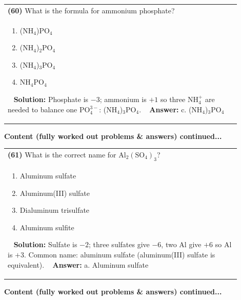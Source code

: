 \documentclass{article}
\begin{document}
\begin{tabular}{|p{0.9\linewidth}|}
\hline
\vspace{0.2cm}
\textbf{(60)} What is the formula for ammonium phosphate? \\
\begin{minipage}[t]{0.85\linewidth}
\begin{enumerate}[label=\alph*.]
\item (NH$_4$)PO$_4$ \
\item (NH$_4$)$_2$PO$_4$ \
\item (NH$_4$)$_3$PO$_4$ \
\item NH$_4$PO$_4$
\end{enumerate}
\end{minipage}\
\hline
\vspace{0.2cm}
\textbf{Solution:} Phosphate is $-3$; ammonium is $+1$ so three NH$_4^+$ are needed to balance one PO$_4^{3-}$: (NH$_4$)$_3$PO$_4$. \
\hline
\vspace{0.2cm}
\textbf{Answer:} c. (NH$_4$)$_3$PO$_4$ \
\hline
\end{tabular}
\newpage
\noindent
{\large\textbf{Content (fully worked out problems & answers) continued...}}\\[0.2em]
\begin{tabular}{|p{0.9\linewidth}|}
\hline
\vspace{0.2cm}
\textbf{(61)} What is the correct name for $\text{Al}_2(\text{SO}_4)_3$? \\
\begin{minipage}[t]{0.85\linewidth}
\begin{enumerate}[label=\alph*.]
\item Aluminum sulfate \
\item Aluminum(III) sulfate \
\item Dialuminum trisulfate \
\item Aluminum sulfite
\end{enumerate}
\end{minipage}\
\hline
\vspace{0.2cm}
\textbf{Solution:} Sulfate is $-2$; three sulfates give $-6$, two Al give $+6$ so Al is $+3$. Common name: aluminum sulfate (aluminum(III) sulfate is equivalent). \
\hline
\vspace{0.2cm}
\textbf{Answer:} a. Aluminum sulfate \
\hline
\end{tabular}
\newpage
\noindent
{\large\textbf{Content (fully worked out problems & answers) continued...}}\\[0.2em]
\end{document}
